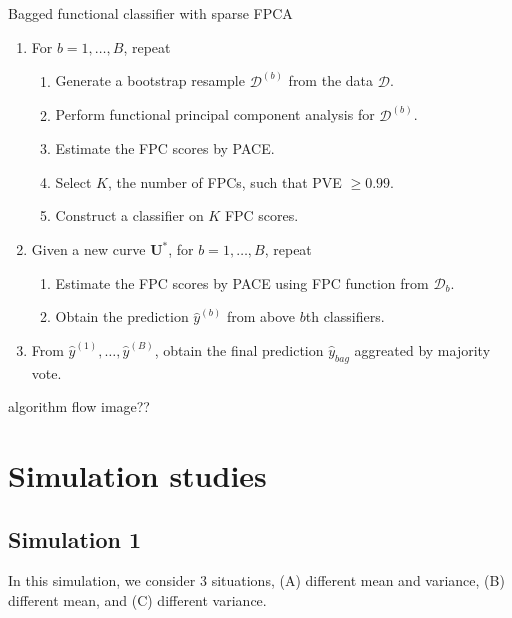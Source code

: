 \documentclass[eng]{csam}
\def \bU { \mathbf{ U } }
\def \bD { \boldsymbol{\mathcal{D}} }
\begin{document}
\begin{algorithm}[H]
	\caption{Bagged functional classifier with sparse FPCA}
	\begin{enumerate}
		\item For $b = 1, \dots, B$, repeat
		\begin{enumerate}
			\item Generate a bootstrap resample $\bD^{(b)}$ from the data $\bD$.
			\item Perform functional principal component analysis for $\bD^{(b)}$.
			\item Estimate the FPC scores by PACE.
			\item Select $K$, the number of FPCs, such that PVE $\ge 0.99$.
			\item Construct a classifier on $K$ FPC scores.
		\end{enumerate}
		\item Given a new curve $\bU^*$, for $b = 1, \dots, B$, repeat
		\begin{enumerate}
			\item Estimate the FPC scores by PACE using FPC function from $\bD_{b}$.
			\item Obtain the prediction $\hat y^{(b)}$ from above $b$th classifiers.
		\end{enumerate}
	
		\item From $\hat y^{(1)}, \dots, \hat y^{(B)}$, obtain the final prediction $\hat y_{bag}$ aggreated by majority vote.
	\end{enumerate}
\end{algorithm}

{\color{red}
	algorithm flow image??
}



\section{Simulation studies}

\subsection{Simulation 1}
In this simulation, we consider 3 situations, (A) different mean and variance, (B) different mean, and (C) different variance.
\end{document}
